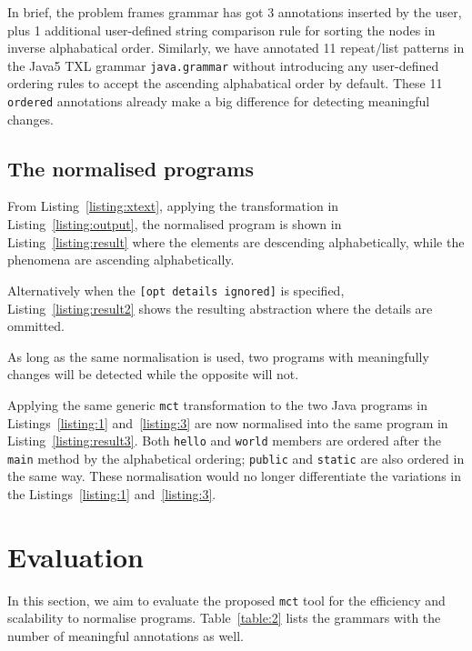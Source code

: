 \documentclass[10pt, conference, compsocconf]{IEEEtran}
\begin{document}


In brief, the problem frames grammar has got 3 annotations inserted by the user, plus 1 additional user-defined string comparison rule for sorting the nodes in inverse alphabatical order. Similarly, we have annotated 11 repeat/list patterns in
the Java5 TXL grammar {\tt java.grammar} without introducing any user-defined ordering rules to accept the ascending alphabatical order by default. These 11 {\tt ordered} annotations already make a big difference for detecting meaningful changes.
\subsection{The normalised programs}
From Listing~\ref{listing:xtext}, applying the transformation in Listing~\ref{listing:output}, the normalised program is shown in Listing~\ref{listing:result} where the elements are descending alphabetically, while the phenomena are ascending alphabetically.

Alternatively when the {\tt [opt details ignored]} is specified, Listing~\ref{listing:result2} shows the resulting abstraction where the details are ommitted.

As long as the same normalisation is used, two programs with meaningfully changes will be detected while the opposite will not.

Applying the same generic {\tt mct} transformation to the two Java programs in Listings~\ref{listing:1} and~\ref{listing:3} are now normalised into the same program in Listing~\ref{listing:result3}. Both {\tt hello} and {\tt world} members are ordered after the {\tt main} method by the alphabetical ordering;  {\tt public} and {\tt static} are also ordered in the same way. These normalisation would no longer differentiate the variations in the Listings~\ref{listing:1} and~\ref{listing:3}.


\section{Evaluation}
In this section, we aim to evaluate the proposed {\tt mct} tool for the efficiency and scalability to normalise programs.
Table~\ref{table:2} lists the grammars with the number of meaningful annotations as well.
\end{document}
